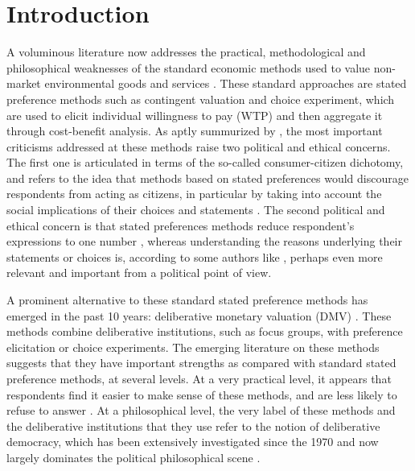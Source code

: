 \documentclass[version=3.21, pagesize, twoside=off, bibliography=totoc, DIV=calc, fontsize=12pt, a4paper, french, english]{scrartcl}
\begin{document}
\section{Introduction}
A voluminous literature now addresses the practical, methodological and philosophical weaknesses of the standard economic methods used to value non-market environmental goods and services \citep{meinard_ethical_2016}. These standard approaches are stated preference methods such as contingent valuation and choice experiment, which are used to elicit individual willingness to pay (WTP) and then aggregate it through cost-benefit analysis. As aptly summurized by \citet{bartkowski_beyond_2018}, the most important criticisms addressed at these methods raise two political and ethical concerns. The first one is articulated in terms of the so-called consumer-citizen dichotomy, and refers to the idea that methods based on stated preferences would discourage respondents from acting as citizens, in particular by taking into account the social implications of their choices and statements \citep{soma_representing_2014, vatn_institutional_2009}. The second political and ethical concern is that stated preferences methods reduce respondent's expressions to one number , whereas understanding the reasons underlying their statements or choices is, according to some authors like \citet{sen_environmental_1995}, perhaps even more relevant and important from a political point of view.

A prominent alternative to these standard stated preference methods has emerged in the past 10 years: deliberative monetary valuation (DMV) \citep{spash_deliberative_2007,bartkowski_economic_2017}. These methods combine deliberative institutions, such as focus groups, with preference elicitation or choice experiments. The emerging literature on these methods suggests that they have important strengths as compared with standard stated preference methods, at several levels. At a very practical level, it appears that respondents find it easier to make sense of these methods, and are less likely to refuse to answer \citep{lienhoop_contingent_2007,szabo_reducing_2011}. At a philosophical level, the very label of these methods and the deliberative institutions that they use refer to the notion of deliberative democracy, which has been extensively investigated since the 1970 and now largely dominates the political philosophical scene \citep{chappell_deliberative_2012}.
\end{document}
